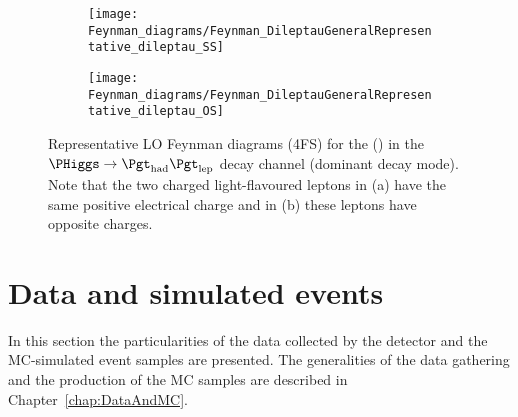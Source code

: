 \begin{figure}[h]
  \centering  
  \begin{subfigure}[b]{0.45\textwidth}
    \centering
    \texttt{[image: Feynman\_diagrams/Feynman\_DileptauGeneralRepresentative\_dileptau\_SS]}
    \caption{\dilepSStau}
    \label{fig:tHq:intro:diltauFeynmanDiagram:SS}
  \end{subfigure}
  \hfill
  \begin{subfigure}[b]{0.45\textwidth}
    \centering
    \texttt{[image: Feynman\_diagrams/Feynman\_DileptauGeneralRepresentative\_dileptau\_OS]}
    \caption{\dilepOStau}
    \label{fig:tHq:intro:diltauFeynmanDiagram:OS}
  \end{subfigure}
  \caption{Representative LO Feynman diagrams (4FS) for the \tHq (\dileptau) in the $\PHiggs \rightarrow \tauhad \taulep$ decay channel 
  (dominant decay mode).
  Note that the two charged light-flavoured leptons in (a) have the same positive electrical 
  charge and in (b) these leptons have opposite charges.}
  \label{fig:tHq:intro:diltauFeynmanDiagram}
\end{figure}









\section{Data and simulated events }
\label{sec:ChaptH:Data_and_MC}
In this section the particularities of the data collected by the detector 
and the MC-simulated event samples are presented. The generalities 
of the data gathering and the production of the MC samples are
described in Chapter~\ref{chap:DataAndMC}.

